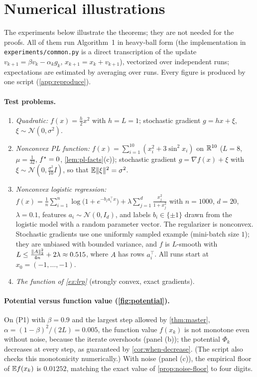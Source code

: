 \section{Numerical illustrations}\label{sec:experiments}

The experiments below illustrate the theorems; they are not needed for the proofs. All of
them run Algorithm~1 in heavy-ball form (the implementation in
\texttt{experiments/common.py} is a direct transcription of the update
$v_{k+1}=\beta v_k-\alpha_kg_k$, $x_{k+1}=x_k+v_{k+1}$), vectorized over independent runs;
expectations are estimated by averaging over runs. Every figure is produced by one script
(\cref{app:reproduce}).

\paragraph{Test problems.}
\begin{enumerate}[label=(P\arabic*)]
\item \emph{Quadratic:} $f(x)=\frac h2x^2$ with $h=L=1$; stochastic gradient
  $g=hx+\xi$, $\xi\sim\mathcal N(0,\sigma^2)$.
\item \emph{Nonconvex PL function:} $f(x)=\sum_{i=1}^{10}(x_i^2+3\sin^2x_i)$ on $\mathbb{R}^{10}$
  ($L=8$, $\mu=\frac1{32}$, $f^\star=0$, \cref{lem:pl-facts}(c)); stochastic gradient
  $g=\nabla f(x)+\xi$ with $\xi\sim\mathcal N(0,\frac{\sigma^2}{10}I)$, so that
  $\mathbb{E}\lVert \xi\rVert^2=\sigma^2$.
\item \emph{Nonconvex logistic regression:}
  $f(x)=\frac1n\sum_{i=1}^n\log\bigl(1+e^{-b_ia_i^\top x}\bigr)+\lambda\sum_{j=1}^d\frac{x_j^2}{1+x_j^2}$
  with $n=1000$, $d=20$, $\lambda=0.1$, features $a_i\sim\mathcal N(0,I_d)$, and labels
  $b_i\in\{\pm1\}$ drawn from the logistic model with a random parameter vector. The
  regularizer is nonconvex. Stochastic gradients use one uniformly sampled example (mini-batch
  size $1$); they are unbiased with bounded variance, and $f$ is $L$-smooth with
  $L\le\frac{\lVert A\rVert_2^2}{4n}+2\lambda\approx0.515$, where $A$ has rows $a_i^\top$. All runs start
  at $x_0=(-1,\dots,-1)$.
\item \emph{The function of \cref{ex:lrp}} (strongly convex, exact gradients).
\end{enumerate}

\paragraph{Potential versus function value (\cref{fig:potential}).} On (P1) with $\beta=0.9$
and the largest step allowed by \cref{thm:master}, $\alpha=(1-\beta)^2/(2L)=0.005$, the
function value $f(x_k)$ is not monotone even without noise, because the iterate overshoots
(panel (b)); the potential $\Phi_k$ decreases at every step, as guaranteed by
\cref{cor:when-decrease}. (The script also checks this monotonicity numerically.) With noise
(panel (c)), the empirical floor of $\mathbb{E} f(x_k)$ is $0.01252$, matching the exact value of
\cref{prop:noise-floor} to four digits.

